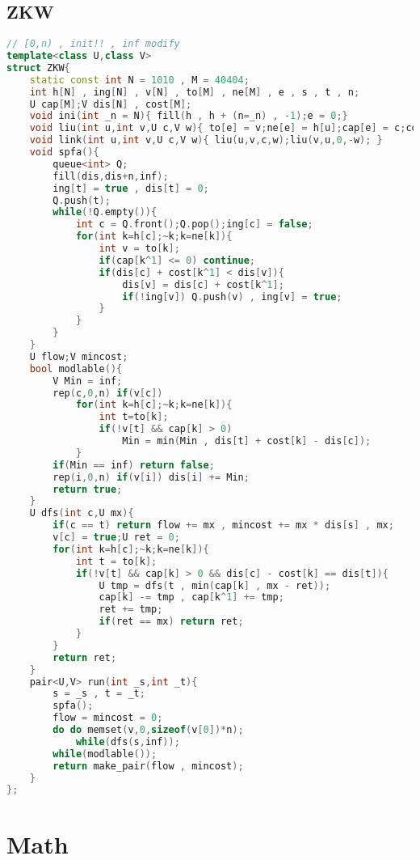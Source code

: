 \subsection{ZKW}
\begin{lstlisting}[language=C++]
// [0,n) , init!! , inf modify
template<class U,class V>
struct ZKW{
    static const int N = 1010 , M = 40404;
    int h[N] , ing[N] , v[N] , to[M] , ne[M] , e , s , t , n;
    U cap[M];V dis[N] , cost[M];
    void ini(int _n = N){ fill(h , h + (n=_n) , -1);e = 0;}
    void liu(int u,int v,U c,V w){ to[e] = v;ne[e] = h[u];cap[e] = c;cost[e] = w;h[u] = e++;}
    void link(int u,int v,U c,V w){ liu(u,v,c,w);liu(v,u,0,-w); }
    void spfa(){
        queue<int> Q;
        fill(dis,dis+n,inf);
        ing[t] = true , dis[t] = 0;
        Q.push(t);
        while(!Q.empty()){
            int c = Q.front();Q.pop();ing[c] = false;
            for(int k=h[c];~k;k=ne[k]){
                int v = to[k];
                if(cap[k^1] <= 0) continue;
                if(dis[c] + cost[k^1] < dis[v]){
                    dis[v] = dis[c] + cost[k^1];
                    if(!ing[v]) Q.push(v) , ing[v] = true;
                }
            }
        }
    }
    U flow;V mincost;
    bool modlable(){
        V Min = inf;
        rep(c,0,n) if(v[c])
            for(int k=h[c];~k;k=ne[k]){
                int t=to[k];
                if(!v[t] && cap[k] > 0)
                    Min = min(Min , dis[t] + cost[k] - dis[c]);
            }
        if(Min == inf) return false;
        rep(i,0,n) if(v[i]) dis[i] += Min;
        return true;
    }
    U dfs(int c,U mx){
        if(c == t) return flow += mx , mincost += mx * dis[s] , mx;
        v[c] = true;U ret = 0;
        for(int k=h[c];~k;k=ne[k]){
            int t = to[k];
            if(!v[t] && cap[k] > 0 && dis[c] - cost[k] == dis[t]){
                U tmp = dfs(t , min(cap[k] , mx - ret));
                cap[k] -= tmp , cap[k^1] += tmp;
                ret += tmp;
                if(ret == mx) return ret;
            }
        }
        return ret;
    }
    pair<U,V> run(int _s,int _t){
        s = _s , t = _t;
        spfa();
        flow = mincost = 0;
        do do memset(v,0,sizeof(v[0])*n);
            while(dfs(s,inf));
        while(modlable());
        return make_pair(flow , mincost);
    }
};
\end{lstlisting}

\section{Math}
